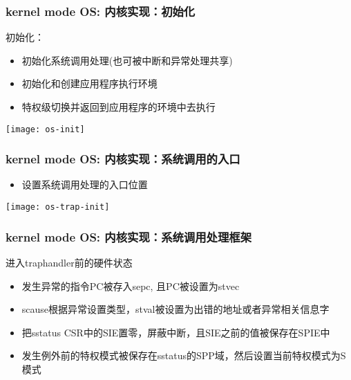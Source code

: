 \begin{frame}
    \frametitle{kernel mode OS: 内核实现：初始化}
    初始化：
    \begin{itemize}
        
        \item 初始化系统调用处理(也可被中断和异常处理共享)
        \item 初始化和创建应用程序执行环境
        \item 特权级切换并返回到应用程序的环境中去执行
        
    \end{itemize}	
        \centering
        \texttt{[image: os-init]}
\end{frame}

\begin{frame}
    \frametitle{kernel mode OS: 内核实现：系统调用的入口}
    
    \begin{itemize}
        
        \item 设置系统调用处理的入口位置

        
    \end{itemize}	
    \centering
    \texttt{[image: os-trap-init]}
\end{frame}


\begin{frame}
    \frametitle{kernel mode OS: 内核实现：系统调用处理框架}
    进入trap\-handler前的硬件状态
    \begin{itemize}
        
    \item 发生异常的指令PC被存入sepc, 且PC被设置为stvec
    \item scause根据异常设置类型，stval被设置为出错的地址或者异常相关信息字
    \item 把sstatus CSR中的SIE置零，屏蔽中断，且SIE之前的值被保存在SPIE中
    \item 发生例外前的特权模式被保存在sstatus的SPP域，然后设置当前特权模式为S模式
        
    \end{itemize}	
\end{frame}

